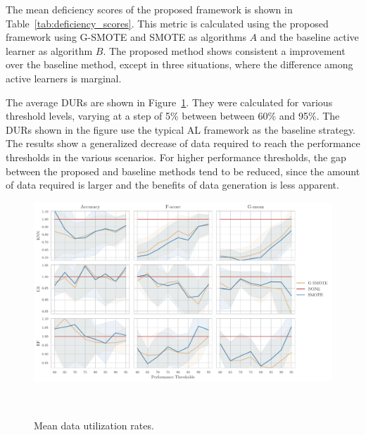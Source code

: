 \documentclass[parskip=full]{scrartcl}
\begin{document}

The mean deficiency scores of the proposed framework is shown in
Table~\ref{tab:deficiency_scores}. This metric is calculated using the proposed
framework using G-SMOTE and SMOTE as algorithms $A$ and the baseline active
learner as algorithm $B$. The proposed method shows consistent a improvement
over the baseline method, except in three situations, where the difference among
active learners is marginal.


The average DURs are shown in Figure~\ref{fig:dur}. They were calculated for
various threshold levels, varying at a step of 5\% between between 60\% and
95\%. The DURs shown in the figure use the typical AL framework as the baseline
strategy. The results show a generalized decrease of data required to reach the
performance thresholds in the various scenarios. For higher performance
thresholds, the gap between the proposed and baseline methods tend to be
reduced, since the amount of data required is larger and the benefits of data
generation is less apparent.

\begin{figure}[H]
	\centering
	\includegraphics[width=1\linewidth]{../analysis/data_utilization_rate}
    \caption{Mean data utilization rates.}~\label{fig:dur}
\end{figure}
\end{document}
